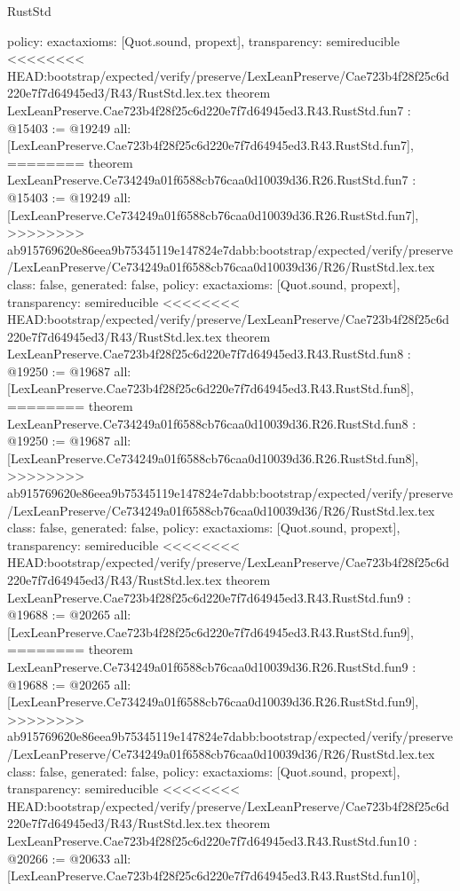\begin{lexlean}{RustStd}
\begin{coremodule}
{\begin{coremodule}
{{{{{{{{{{  policy: exact{axioms: [Quot.sound, propext]},
  transparency: semireducible
}
<<<<<<<< HEAD:bootstrap/expected/verify/preserve/LexLeanPreserve/Cae723b4f28f25c6d220e7f7d64945ed3/R43/RustStd.lex.tex
theorem LexLeanPreserve.Cae723b4f28f25c6d220e7f7d64945ed3.R43.RustStd.fun7 : @15403 := @19249 {
  all: [LexLeanPreserve.Cae723b4f28f25c6d220e7f7d64945ed3.R43.RustStd.fun7],
========
theorem LexLeanPreserve.Ce734249a01f6588cb76caa0d10039d36.R26.RustStd.fun7 : @15403 := @19249 {
  all: [LexLeanPreserve.Ce734249a01f6588cb76caa0d10039d36.R26.RustStd.fun7],
>>>>>>>> ab915769620e86eea9b75345119e147824e7dabb:bootstrap/expected/verify/preserve/LexLeanPreserve/Ce734249a01f6588cb76caa0d10039d36/R26/RustStd.lex.tex
  class: false,
  generated: false,
  policy: exact{axioms: [Quot.sound, propext]},
  transparency: semireducible
}
<<<<<<<< HEAD:bootstrap/expected/verify/preserve/LexLeanPreserve/Cae723b4f28f25c6d220e7f7d64945ed3/R43/RustStd.lex.tex
theorem LexLeanPreserve.Cae723b4f28f25c6d220e7f7d64945ed3.R43.RustStd.fun8 : @19250 := @19687 {
  all: [LexLeanPreserve.Cae723b4f28f25c6d220e7f7d64945ed3.R43.RustStd.fun8],
========
theorem LexLeanPreserve.Ce734249a01f6588cb76caa0d10039d36.R26.RustStd.fun8 : @19250 := @19687 {
  all: [LexLeanPreserve.Ce734249a01f6588cb76caa0d10039d36.R26.RustStd.fun8],
>>>>>>>> ab915769620e86eea9b75345119e147824e7dabb:bootstrap/expected/verify/preserve/LexLeanPreserve/Ce734249a01f6588cb76caa0d10039d36/R26/RustStd.lex.tex
  class: false,
  generated: false,
  policy: exact{axioms: [Quot.sound, propext]},
  transparency: semireducible
}
<<<<<<<< HEAD:bootstrap/expected/verify/preserve/LexLeanPreserve/Cae723b4f28f25c6d220e7f7d64945ed3/R43/RustStd.lex.tex
theorem LexLeanPreserve.Cae723b4f28f25c6d220e7f7d64945ed3.R43.RustStd.fun9 : @19688 := @20265 {
  all: [LexLeanPreserve.Cae723b4f28f25c6d220e7f7d64945ed3.R43.RustStd.fun9],
========
theorem LexLeanPreserve.Ce734249a01f6588cb76caa0d10039d36.R26.RustStd.fun9 : @19688 := @20265 {
  all: [LexLeanPreserve.Ce734249a01f6588cb76caa0d10039d36.R26.RustStd.fun9],
>>>>>>>> ab915769620e86eea9b75345119e147824e7dabb:bootstrap/expected/verify/preserve/LexLeanPreserve/Ce734249a01f6588cb76caa0d10039d36/R26/RustStd.lex.tex
  class: false,
  generated: false,
  policy: exact{axioms: [Quot.sound, propext]},
  transparency: semireducible
}
<<<<<<<< HEAD:bootstrap/expected/verify/preserve/LexLeanPreserve/Cae723b4f28f25c6d220e7f7d64945ed3/R43/RustStd.lex.tex
theorem LexLeanPreserve.Cae723b4f28f25c6d220e7f7d64945ed3.R43.RustStd.fun10 : @20266 := @20633 {
  all: [LexLeanPreserve.Cae723b4f28f25c6d220e7f7d64945ed3.R43.RustStd.fun10],
}}}}}}}}}}}}}
\end{coremodule}}
\end{coremodule}
\end{lexlean}
